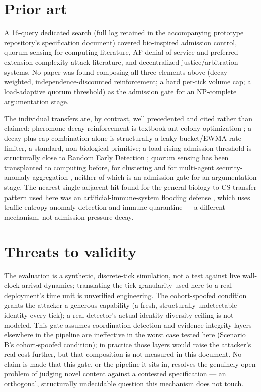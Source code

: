 \documentclass[11pt]{article}
\begin{document}
\section{Prior art}
\label{sec:priorart}

A 16-query dedicated search (full log retained in the accompanying prototype
repository's specification document) covered bio-inspired admission control,
quorum-sensing-for-computing literature, AF-denial-of-service and preferred-extension
complexity-attack literature, and decentralized-justice/arbitration systems. No paper
was found composing all three elements above (decay-weighted, independence-discounted
reinforcement; a hard per-tick volume cap; a load-adaptive quorum threshold) as the
admission gate for an NP-complete argumentation stage.

The individual transfers are, by contrast, well precedented and cited rather than
claimed: pheromone-decay reinforcement is textbook ant colony optimization
\cite{dorigo2004,dicaro1998}; a decay-plus-cap combination alone is structurally a
leaky-bucket/EWMA rate limiter, a standard, non-biological primitive; a load-rising
admission threshold is structurally close to Random Early Detection
\cite{floyd1993}; quorum sensing has been transplanted to computing before, for
clustering \cite{wang2013} and for multi-agent security-anomaly aggregation
\cite{fioravanti2012}, neither of which is an admission gate for an argumentation
stage. The nearest single adjacent hit found for the general biology-to-CS transfer
pattern used here was an artificial-immune-system flooding defense
\cite{aiartnet2024}, which uses traffic-entropy anomaly detection and immune
quarantine --- a different mechanism, not admission-pressure decay.

\section{Threats to validity}
\label{sec:threats}

The evaluation is a synthetic, discrete-tick simulation, not a test against live
wall-clock arrival dynamics; translating the tick granularity used here to a real
deployment's time unit is unverified engineering. The cohort-spoofed condition grants
the attacker a generous capability (a fresh, structurally undetectable identity every
tick); a real detector's actual identity-diversity ceiling is not modeled. This gate
assumes coordination-detection and evidence-integrity layers elsewhere in the pipeline
are ineffective in the worst case tested here (Scenario B's cohort-spoofed condition);
in practice those layers would raise the attacker's real cost further, but that
composition is not measured in this document. No claim is made that this gate, or the
pipeline it sits in, resolves the genuinely open problem of judging novel content
against a contested specification --- an orthogonal, structurally undecidable question
this mechanism does not touch.
\end{document}
